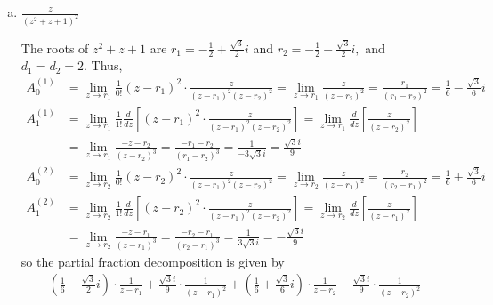 \documentclass{article}
\begin{document}
\begin{itemize}
\begin{enumerate}[(a)]
			\item $\frac{z}{(z^2+z+1)^2}$
				\begin{soln}
					The roots of $z^2+z+1$ are $r_1=-\frac{1}{2} + \frac{\sqrt{3}}{2}i$ and $r_2=-\frac{1}{2} - \frac{\sqrt{3}}{2}i,$ and $d_1=d_2=2.$ Thus,
					\begin{align*}
						A_0^{(1)} &= \lim_{z\to r_1} \frac{1}{0!} (z-r_1)^2 \cdot \frac{z}{(z-r_1)^2(z-r_2)^2} = \lim_{z\to r_1} \frac{z}{(z-r_2)^2} = \frac{r_1}{(r_1-r_2)^2} = \frac{1}{6}-\frac{\sqrt{3}}{6} i \\
						A_1^{(1)} &= \lim_{z\to r_1} \frac{1}{1!} \frac{d}{dz}\left[(z-r_1)^2\cdot \frac{z}{(z-r_1)^2(z-r_2)^2}\right] = \lim_{z\to r_1} \frac{d}{dz} \left[ \frac{z}{(z-r_2)^2} \right] \\
						&= \lim_{z\to r_1} \frac{-z-r_2}{(z-r_2)^3} = \frac{-r_1-r_2}{(r_1-r_2)^3} = \frac{1}{-3\sqrt{3}i} = \frac{\sqrt{3}i}{9} \\
						A_0^{(2)} &= \lim_{z\to r_2} \frac{1}{0!} (z-r_2)^2 \cdot \frac{z}{(z-r_1)^2(z-r_2)^2} = \lim_{z\to r_2} \frac{z}{(z-r_1)^2} = \frac{r_2}{(r_2-r_1)^2} = \frac{1}{6} + \frac{\sqrt{3}}{6}i \\
						A_1^{(2)} &= \lim_{z\to r_2} \frac{1}{1!} \frac{d}{dz} \left[ (z-r_2)^2\cdot \frac{z}{(z-r_1)^2(z-r_2)^2} \right] = \lim_{z\to r_2} \frac{d}{dz} \left[ \frac{z}{(z-r_1)^2} \right] \\
						&= \lim_{z\to r_2} \frac{-z-r_1}{(z-r_1)^3} = \frac{-r_2-r_1}{ (r_2-r_1)^3} = \frac{1}{3\sqrt{3}i} = -\frac{\sqrt{3}i}{9}
					\end{align*}
					so the partial fraction decomposition is given by
					\begin{align*}
						\left( \frac{1}{6}-\frac{\sqrt{3}}{2}i \right)\cdot \frac{1}{z-r_1} + \frac{\sqrt{3}i}{9}\cdot \frac{1}{(z-r_1)^2} + \left( \frac{1}{6}+\frac{\sqrt{3}}{6}i \right)\cdot \frac{1}{z-r_2} - \frac{\sqrt{3}i}{9}\cdot \frac{1}{(z-r_2)^2}
					\end{align*}
				\end{soln}


\end{enumerate}
\end{itemize}
\end{document}
